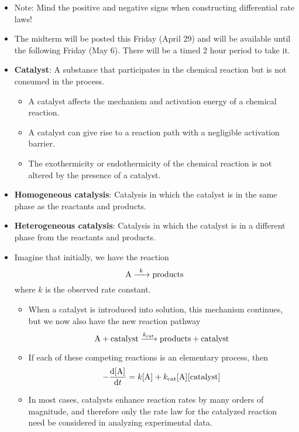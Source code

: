 \documentclass[../notes.tex]{subfiles}
\begin{document}
\begin{itemize}
\begin{itemize}
\begin{itemize}
        \end{itemize}
    \end{itemize}
    \item Note: Mind the positive and negative signs when constructing differential rate laws!
    \item The midterm will be posted this Friday (April 29) and will be available until the following Friday (May 6). There will be a timed 2 hour period to take it.
    \item \textbf{Catalyst}: A substance that participates in the chemical reaction but is not consumed in the process.
    \begin{itemize}
        \item A catalyst affects the mechanism and activation energy of a chemical reaction.
        \item A catalyst can give rise to a reaction path with a negligible activation barrier.
        \item The exothermicity or endothermicity of the chemical reaction is not altered by the presence of a catalyst.
    \end{itemize}
    \item \textbf{Homogeneous catalysis}: Catalysis in which the catalyst is in the same phase as the reactants and products.
    \item \textbf{Heterogeneous catalysis}: Catalysis in which the catalyst is in a different phase from the reactants and products.
    \item Imagine that initially, we have the reaction
    \begin{equation*}
        \ce{A ->[$k$] products}
    \end{equation*}
    where $k$ is the observed rate constant.
    \begin{itemize}
        \item When a catalyst is introduced into solution, this mechanism continues, but we now also have the new reaction pathway
        \begin{equation*}
            \ce{A + catalyst ->[$k_\text{cat}$] products + catalyst}
        \end{equation*}
        \item If each of these competing reactions is an elementary process, then
        \begin{equation*}
            -\dv{\cnc{A}}{t} = k\cnc{A}+k_\text{cat}\cnc{A}\cnc{catalyst}
        \end{equation*}
        \item In most cases, catalysts enhance reaction rates by many orders of magnitude, and therefore only the rate law for the catalyzed reaction need be considered in analyzing experimental data.

\end{itemize}
\end{itemize}
\end{document}
